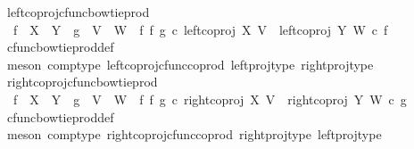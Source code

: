 \begin{isabellebody}
{\isafoldproof}%
%
\isadelimproof
\isanewline
%
\endisadelimproof
\isanewline
{}\isamarkupfalse%
\ left{\isacharunderscore}{\kern0pt}coproj{\isacharunderscore}{\kern0pt}cfunc{\isacharunderscore}{\kern0pt}bowtie{\isacharunderscore}{\kern0pt}prod{\isacharcolon}{\kern0pt}\isanewline
\ \ {\isachardoublequoteopen}f\ {\isacharcolon}{\kern0pt}\ X\ {\isasymrightarrow}\ Y\ {\isasymLongrightarrow}\ g\ {\isacharcolon}{\kern0pt}\ V\ {\isasymrightarrow}\ W\ {\isasymLongrightarrow}\ {\isacharparenleft}{\kern0pt}f\ {\isasymbowtie}\isactrlsub f\ g{\isacharparenright}{\kern0pt}\ {\isasymcirc}\isactrlsub c\ left{\isacharunderscore}{\kern0pt}coproj\ X\ V\ {\isacharequal}{\kern0pt}\ left{\isacharunderscore}{\kern0pt}coproj\ Y\ W\ {\isasymcirc}\isactrlsub c\ f{\isachardoublequoteclose}\isanewline
%
\isadelimproof
\ \ %
\endisadelimproof
%
\isatagproof
{}\isamarkupfalse%
\ cfunc{\isacharunderscore}{\kern0pt}bowtie{\isacharunderscore}{\kern0pt}prod{\isacharunderscore}{\kern0pt}def{}\isanewline
\ \ \isamarkupfalse%
\ {\isacharparenleft}{\kern0pt}meson\ comp{\isacharunderscore}{\kern0pt}type\ left{\isacharunderscore}{\kern0pt}coproj{\isacharunderscore}{\kern0pt}cfunc{\isacharunderscore}{\kern0pt}coprod\ left{\isacharunderscore}{\kern0pt}proj{\isacharunderscore}{\kern0pt}type\ right{\isacharunderscore}{\kern0pt}proj{\isacharunderscore}{\kern0pt}type{\isacharparenright}{\kern0pt}%
\endisatagproof
{\isafoldproof}%
%
\isadelimproof
\isanewline
%
\endisadelimproof
\isanewline
\ \isamarkupfalse%
\ right{\isacharunderscore}{\kern0pt}coproj{\isacharunderscore}{\kern0pt}cfunc{\isacharunderscore}{\kern0pt}bowtie{\isacharunderscore}{\kern0pt}prod{\isacharcolon}{\kern0pt}\isanewline
\ \ {\isachardoublequoteopen}f\ {\isacharcolon}{\kern0pt}\ X\ {\isasymrightarrow}\ Y\ {\isasymLongrightarrow}\ g\ {\isacharcolon}{\kern0pt}\ V\ {\isasymrightarrow}\ W\ {\isasymLongrightarrow}\ {\isacharparenleft}{\kern0pt}f\ {\isasymbowtie}\isactrlsub f\ g{\isacharparenright}{\kern0pt}\ {\isasymcirc}\isactrlsub c\ right{\isacharunderscore}{\kern0pt}coproj\ X\ V\ {\isacharequal}{\kern0pt}\ right{\isacharunderscore}{\kern0pt}coproj\ Y\ W\ {\isasymcirc}\isactrlsub c\ g{\isachardoublequoteclose}\isanewline
%
\isadelimproof
\ \ %
\endisadelimproof
%
\isatagproof
{}\isamarkupfalse%
\ cfunc{\isacharunderscore}{\kern0pt}bowtie{\isacharunderscore}{\kern0pt}prod{\isacharunderscore}{\kern0pt}def{}\isanewline
\ \ \isamarkupfalse%
\ {\isacharparenleft}{\kern0pt}meson\ comp{\isacharunderscore}{\kern0pt}type\ right{\isacharunderscore}{\kern0pt}coproj{\isacharunderscore}{\kern0pt}cfunc{\isacharunderscore}{\kern0pt}coprod\ right{\isacharunderscore}{\kern0pt}proj{\isacharunderscore}{\kern0pt}type\ left{\isacharunderscore}{\kern0pt}proj{\isacharunderscore}{\kern0pt}type{\isacharparenright}{\kern0pt}%

\end{isabellebody}
